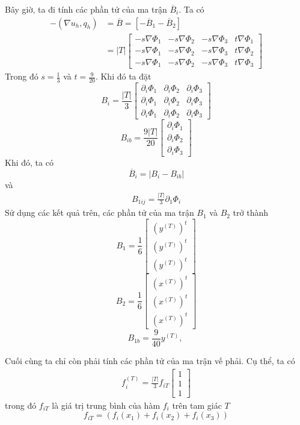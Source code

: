 \documentclass[14pt]{extreport}
\begin{document}
{Bây giờ, ta đi tính các phần tử của ma trận $\overline{B}_i$. Ta có
\begin{equation} \label{eq25}
\begin{split}
-(\nabla u_h, q_h) & = \overline{B} = \left[ -\overline{B}_1 - \overline{B}_2 \right] \\
& = |T| 
\begin{bmatrix}
-s \nabla \Phi_1 & -s \nabla \Phi_2 & -s \nabla \Phi_3 & t \nabla \Phi_1 \\
-s \nabla \Phi_1 & -s \nabla \Phi_2 & -s \nabla \Phi_3 & t \nabla \Phi_2 \\
-s \nabla \Phi_1 & -s \nabla \Phi_2 & -s \nabla \Phi_3 & t \nabla \Phi_3
\end{bmatrix}
\end{split}
\end{equation}
Trong đó $s = \frac{1}{3}$ và $t = \frac{9}{20}$. Khi đó ta đặt
\[
B_i = \frac{|T|}{3}
\begin{bmatrix}
\partial_i \Phi_1 & \partial_i \Phi_2 & \partial_i \Phi_3 \\
\partial_i \Phi_1 & \partial_i \Phi_2 & \partial_i \Phi_3 \\
\partial_i \Phi_1 & \partial_i \Phi_2 & \partial_i \Phi_3 
\end{bmatrix}
\]
\[
B_{ib} = \frac{9|T|}{20}
\begin{bmatrix}
\partial_i \Phi_1 \\
\partial_i \Phi_2 \\
\partial_i \Phi_3
\end{bmatrix}
\]
Khi đó, ta có
$$\overline{B}_i = |B_i - B_{ib}|$$
và
\begin{equation} \label{eq26}
\begin{split}
B_{1ij} = \frac{|T|}{3} \partial_1 \Phi_i
\end{split}
\end{equation}
Sử dụng các kết quả trên, các phần tử của ma trận $B_1$ và $B_2$ trở thành
\[
B_1 = \frac{1}{6}
\begin{bmatrix}
(y^{(T)})^t \\
(y^{(T)})^t \\
(y^{(T)})^t
\end{bmatrix}
\]
\[
B_2 = \frac{1}{6}
\begin{bmatrix}
(x^{(T)})^t \\
(x^{(T)})^t \\
(x^{(T)})^t
\end{bmatrix}
\]
$$B_{1b} = \frac{9}{40} y^{(T)}, \ $$

Cuối cùng ta chỉ còn phải tính các phần tử của ma trận vế phải. Cụ thể, ta có
\begin{equation} \label{eq27}
\begin{split}
f_i^{(T)} = \frac{|T|}{3} f_{iT}
\begin{bmatrix}
1 \\
1 \\
1
\end{bmatrix}
\end{split}
\end{equation}
trong đó $f_{iT}$ là giá trị trung bình của hàm $f_i$ trên tam giác $T$
$$f_{iT} = (f_i(x_1) + f_i(x_2) + f_i(x_3))$$

}
\end{document}
